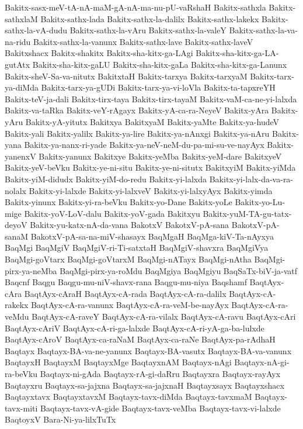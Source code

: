 {Bakitx-sasx-meV-tA-nA-maM-gA-nA-ma-nu-pU-vaRshaH
Bakitx-sathxla
Bakitx-sathxlaM
Bakitx-sathx-lada
Bakitx-sathx-la-dalilx
Bakitx-sathx-lakekx
Bakitx-sathx-la-vA-dudu
Bakitx-sathx-la-vAru
Bakitx-sathx-la-valeY
Bakitx-sathx-la-va-na-ridu
Bakitx-sathx-la-vanunx
Bakitx-sathx-lave
Bakitx-sathx-laveV
Bakitxshacx
Bakitx-shakitx
Bakitx-sha-kitx-ga-LAgi
Bakitx-sha-kitx-ga-LA-gutAtx
Bakitx-sha-kitx-gaLU
Bakitx-sha-kitx-gaLa
Bakitx-sha-kitx-ga-Lanunx
Bakitx-sheV-Sa-va-nitutx
BakitxtaH
Bakitx-tarxya
Bakitx-tarxyaM
Bakitx-tarx-ya-diMda
Bakitx-tarx-ya-gUDi
Bakitx-tarx-ya-vi-loVla
Bakitx-ta-tapxreYH
Bakitx-teV-ja-dali
Bakitx-tirx-taya
Bakitx-tirx-tayaM
Bakitx-vaM-ca-ne-yi-lalxda
Bakitx-va-taRka
Bakitx-veY-rAgayx
Bakitx-yA-ca-ra-NeyeV
Bakitx-yAra
Bakitx-yAru
Bakitx-yA-yitutx
Bakitxya
BakitxyaM
Bakitx-yaMte
Bakitx-ya-hudeV
Bakitx-yali
Bakitx-yalilx
Bakitx-ya-lire
Bakitx-ya-nAnxgi
Bakitx-ya-nAru
Bakitx-yana
Bakitx-ya-nanx-ri-yade
Bakitx-ya-neV-neM-du-pa-mi-su-ve-nayAyx
Bakitx-yanenxV
Bakitx-yanunx
Bakitxye
Bakitx-yeMba
Bakitx-yeM-dare
BakitxyeV
Bakitx-yeV-beVku
Bakitx-ye-ni-situ
Bakitx-ye-ni-situtx
BakitxyiM
Bakitx-yiMda
Bakitx-yiM-didudx
Bakitx-yiM-do-redu
Bakitx-yi-lalxda
Bakitx-yi-lalx-da-va-ra-nolalx
Bakitx-yi-lalxde
Bakitx-yi-lalxveV
Bakitx-yi-lalxyAyx
Bakitx-yimda
Bakitx-yinunx
Bakitx-yi-ra-beVku
Bakitx-yo-Dane
Bakitx-yoLe
Bakitx-yo-Lu-mige
Bakitx-yoV-LoV-dalu
Bakitx-yoV-gada
Bakitxyu
Bakitx-yuM-TA-gu-tatx-deyoV
Bakitx-yu-katx-nA-da-vana
BakotxV
BakotxV-pA-sana
BakotxV-pA-sanaM
BakotxV-pA-sa-na-miV-shasayx
BaqMgaH
BaqMga-kiV-Ta-nAyxya
BaqMgi
BaqMgiV
BaqMgiV-ri-Ti-satxtaH
BaqMgiV-shavxra
BaqMgiVya
BaqMgi-goVtarx
BaqMgi-goVtarxM
BaqMgi-nATayx
BaqMgi-nAtha
BaqMgi-pirx-ya-neMba
BaqMgi-pirx-ya-roMdu
BaqMgiya
BaqMgiyu
BaqSaTx-biV-ja-vatf
Baqcnf
Baqgu
Baqgu-mu-niV-shavx-rana
Baqgu-mu-niya
Baqshamf
BaqtAyx-cAra
BaqtAyx-cAraH
BaqtAyx-cA-rada
BaqtAyx-cA-ra-dalilx
BaqtAyx-cA-rakekx
BaqtAyx-cA-ra-vanunx
BaqtAyx-cA-ra-veM-be-nayAyx
BaqtAyx-cA-ra-veMdu
BaqtAyx-cA-raveY
BaqtAyx-cA-ra-vilalx
BaqtAyx-cA-ravu
BaqtAyx-cAri
BaqtAyx-cAriV
BaqtAyx-cA-ri-ga-lalxde
BaqtAyx-cA-ri-yA-ga-ba-lulxde
BaqtAyx-cAroV
BaqtAyx-ca-raNaM
BaqtAyx-ca-raNe
BaqtAyx-pa-rAdhaH
Baqtayx
Baqtayx-BA-va-ne-yanunx
Baqtayx-BA-vasutx
Baqtayx-BA-va-vanunx
BaqtayxH
BaqtayxM
BaqtayxMge
BaqtayxnAM
Baqtayx-nAgi
Baqtayx-nA-gi-ra-beVku
Baqtayx-ni-gAda
Baqtayx-rA-gi-daRru
Baqtayxra
Baqtayx-rayAyx
Baqtayxru
Baqtayx-sa-jajxna
Baqtayx-sa-jajxnaH
Baqtayxsayx
Baqtayxshacx
Baqtayxtavx
BaqtayxtavxM
Baqtayx-tavx-diMda
Baqtayx-tavxmaM
Baqtayx-tavx-miti
Baqtayx-tavx-vA-gide
Baqtayx-tavx-veMba
Baqtayx-tavx-vi-lalxde
BaqtoyxV
Bara-Ni-ya-lilxTuTx
}
